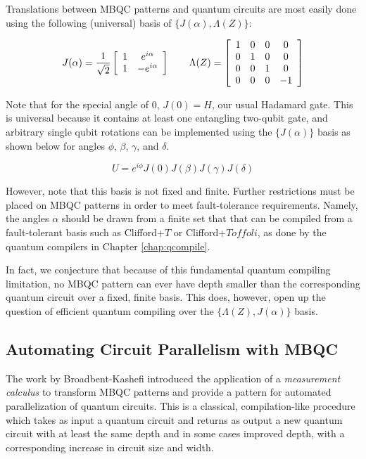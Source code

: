 Translations between MBQC patterns and quantum circuits are most easily
done using the following (universal) basis of $\{J(\alpha), \Lambda(Z)\}$:

\begin{equation}
J(\alpha) = \frac{1}{\sqrt{2}} \left[
\begin{array}{cc}
1 & e^{i\alpha} \\
1 & -e^{i\alpha}
\end{array}
\right]
\qquad
\Lambda(Z) = \left[
\begin{array}{cccc}
1 & 0 & 0 & 0 \\
0 & 1 & 0 & 0 \\
0 & 0 & 1 & 0 \\
0 & 0 & 0 & -1
\end{array}
\right]
\end{equation}

Note that for the special angle of $0$,
$J(0) = H$, our usual Hadamard gate.
This is universal because it contains at least one entangling two-qubit
gate, and arbitrary single qubit rotations can be implemented using
the $\{J(\alpha)\}$ basis as shown below for angles $\phi$, $\beta$, $\gamma$,
and $\delta$.

\begin{equation}
U = e^{i\phi}J(0)J(\beta)J(\gamma)J(\delta)
\end{equation}

However, note that this basis is not
fixed and finite. Further restrictions must be placed on MBQC patterns
in order to meet fault-tolerance requirements. Namely, the angles
$\alpha$ should be drawn from a finite set that that can be compiled from
a fault-tolerant basis such as Clifford+$T$ or Clifford+$Toffoli$, as
done by the quantum compilers in Chapter \ref{chap:qcompile}.

In fact, we conjecture that because of this fundamental quantum
compiling limitation, no MBQC pattern can ever have depth smaller than
the corresponding quantum circuit over a fixed, finite basis. This does,
however, open up the question of efficient quantum compiling over
the $\{\Lambda(Z), J(\alpha)\}$ basis.

\subsection{Automating Circuit Parallelism with MBQC}
\label{subsec:mbqc-par}

The work by Broadbent-Kashefi introduced the application of a
\emph{measurement calculus} to transform MBQC patterns and provide a
pattern for automated parallelization of quantum circuits. This is a
classical, compilation-like procedure which takes as input a quantum
circuit and returns as output a new quantum circuit with at least the
same depth and in some cases improved depth, with a corresponding
increase in circuit size and width.

